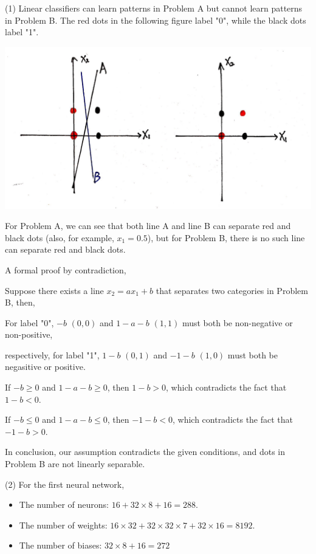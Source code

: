 \documentclass[11pt]{article}
\begin{document}
\begin{solution}
(1) Linear classifiers can learn patterns in Problem A but cannot learn patterns in Problem B. The red dots in the following figure label "0", while the black dots label "1".
\begin{center}
\includegraphics[width=15cm]{4.jpg}
\end{center}
For Problem A, we can see that both line A and line B can separate red and black dots (also, for example, $x_1 = 0.5$), but for Problem B, there is no such line can separate red and black dots.
\item A formal proof by contradiction,
\item \qquad Suppose there exists a line $x_2 = ax_1 +b$ that separates two categories in Problem B, then,
\item \qquad For label "0", $-b$ $(0, 0)$ and $1-a-b$ $(1, 1)$ must both be non-negative or non-positive,
\item \qquad respectively, for label "1", $1-b$ $(0, 1)$ and $-1-b$ $(1, 0)$ must both be negasitive or positive.
\item \qquad If $-b \geq 0$ and $1-a-b \geq 0$, then $1-b > 0$, which contradicts the fact that $1-b < 0$.
\item \qquad If $-b \leq 0$ and $1-a-b \leq 0$, then $-1-b < 0$, which contradicts the fact that $-1-b > 0$.
\item In conclusion, our assumption contradicts the given conditions, and dots in Problem B are not linearly separable.
\item (2) For the first neural network,
\begin{itemize}
\item The number of neurons: $16 + 32 \times 8 + 16 = 288$.
\item The number of weights: $16 \times 32 + 32 \times 32 \times 7 + 32 \times 16 = 8192$.
\item The number of biases: $32 \times 8 + 16 = 272$

\end{itemize}
\end{solution}
\end{document}
